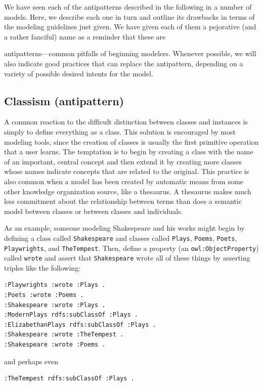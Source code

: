 We have seen each of the antipatterns described in the following in a
number of models. Here, we describe each one in turn and outline its
drawbacks in terms of the modeling guidelines just given. We have given
each of them a pejorative (and a rather fanciful) name as a reminder
that these are

antipatterns---common pitfalls of beginning modelers. Whenever possible,
we will also indicate good practices that can replace the antipattern,
depending on a variety of possible desired intents for the model.

\subsection{Classism (antipattern)}
\label{ch15:classism}

A common reaction to the difficult distinction between classes and
instances is simply to define everything as a class. This solution is
encouraged by most modeling tools, since the creation of classes is
usually the first primitive operation that a user learns. The temptation
is to begin by creating a class with the name of an important, central
concept and then extend it by creating more classes whose names indicate
concepts that are related to the original. This practice is also common
when a model has been created by automatic means from some other
knowledge organization source, like a thesaurus. A thesaurus makes much
less commitment about the relationship between terms than does a
semantic model between classes or between classes and individuals.

As an example, someone modeling Shakespeare and his works might begin by
defining a class called \texttt{Shakespeare} and classes called \texttt{Plays}, \texttt{Poems},
\texttt{Poets}, \texttt{Playwrights}, and \texttt{TheTempest}. Then, define a property (an
\texttt{owl:ObjectProperty}) called \texttt{wrote} and assert that \texttt{Shakespeare} wrote all
of these things by asserting triples like the following:

\begin{lstlisting}
:Playwrights :wrote :Plays .
:Poets :wrote :Poems .
:Shakespeare :wrote :Plays .
:ModernPlays rdfs:subClassOf :Plays .
:ElizabethanPlays rdfs:subClassOf :Plays .
:Shakespeare :wrote :TheTempest . 
:Shakespeare :wrote :Poems .
\end{lstlisting}

and perhaps even

\begin{lstlisting}
:TheTempest rdfs:subClassOf :Plays .
\end{lstlisting}

